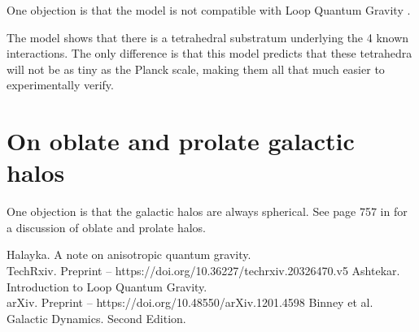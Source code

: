 \documentclass[12pt]{article}
\begin{document}
One objection is that the model is not compatible with Loop Quantum Gravity \cite{ashtekar}.

The model shows that there is a tetrahedral substratum underlying the 4 known interactions.
The only difference is that this model predicts that these tetrahedra will not be as tiny as the Planck scale, making them all that much easier to experimentally verify.




\section{On oblate and prolate galactic halos}

One objection is that the galactic halos are always spherical.
See page 757 in \cite{binney} for a discussion of oblate and prolate halos.





\begin{thebibliography}{9}

 Halayka. A note on anisotropic quantum gravity.\\TechRxiv. Preprint -- https://doi.org/10.36227/techrxiv.20326470.v5
 Ashtekar. Introduction to Loop Quantum Gravity.\\arXiv. Preprint -- https://doi.org/10.48550/arXiv.1201.4598
 Binney et al. Galactic Dynamics. Second Edition.
\end{thebibliography}
\end{document}
